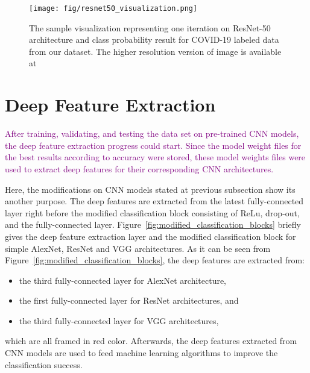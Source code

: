 \begin{landscape}
\begin{figure}[h]
    \centering
    \texttt{[image: fig/resnet50\_visualization.png]}
    \vspace{1mm}
    \caption{The sample visualization representing one iteration on ResNet-50 architecture and class probability result for COVID-19 labeled data from our dataset. The higher resolution version of image is available at \\  \textcolor{blue}{}}
    \label{fig:resnet50_visualization}
\end{figure}
\end{landscape}

\section{Deep Feature Extraction}

\textcolor{purple}{After training, validating, and testing the data set on pre-trained CNN models, the deep feature extraction progress could start. Since the model weight files for the best results according to accuracy were stored, these model weights files were used to extract deep features for their corresponding CNN architectures.}

Here, the modifications on CNN models stated at previous subsection show its another purpose. The deep features are extracted from the latest fully-connected layer right before the modified classification block consisting of ReLu, drop-out, and the fully-connected layer. Figure~\ref{fig:modified_classification_blocks} briefly gives the deep feature extraction layer and the modified classification block for simple AlexNet, ResNet and VGG architectures. As it can be seen from Figure~\ref{fig:modified_classification_blocks}, the deep features are extracted from:

\begin{itemize}
    \item the third fully-connected layer for AlexNet architecture,
    \item the first fully-connected layer for ResNet architectures, and
    \item the third fully-connected layer for VGG architectures,
\end{itemize}

which are all framed in red color. 
Afterwards, the deep features extracted from CNN models are used to feed machine learning algorithms to improve the classification success.

